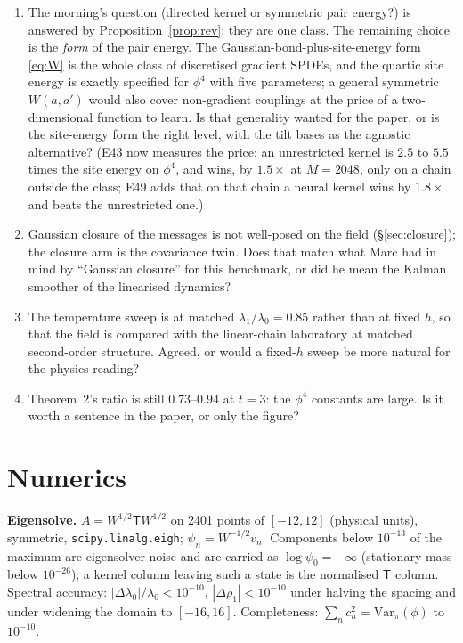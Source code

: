 \documentclass[10pt,a4paper]{article}
\newcommand{\code}[1]{\texttt{\small #1}}
\newcommand{\st}[1]{\textbf{#1}}
\theoremstyle{plain}
\theoremstyle{remark}
\begin{document}
\begin{enumerate}[leftmargin=1.4em,itemsep=0.15em]
\item The morning's question (directed kernel or symmetric pair energy?) is answered by
  Proposition~\ref{prop:rev}: they are one class. The remaining choice is the \emph{form} of the pair
  energy. The Gaussian-bond-plus-site-energy form \eqref{eq:W} is the whole class of discretised
  gradient SPDEs, and the quartic site energy is exactly specified for $\phi^4$ with five parameters;
  a general symmetric $W(a,a')$ would also cover non-gradient couplings at the price of a
  two-dimensional function to learn. Is that generality wanted for the paper, or is the site-energy
  form the right level, with the tilt bases as the agnostic alternative? (E43 now measures the price: an unrestricted kernel is $2.5$ to $5.5$ times the site energy on $\phi^4$, and wins, by $1.5\times$ at $M=2048$, only on a chain outside the class; E49 adds that on that chain a neural kernel wins by $1.8\times$ and beats the unrestricted one.)
\item Gaussian closure of the messages is not well-posed on the field (\S\ref{sec:closure}); the
  closure arm is the covariance twin. Does that match what Marc had in mind by ``Gaussian closure''
  for this benchmark, or did he mean the Kalman smoother of the linearised dynamics?
\item The temperature sweep is at matched $\lambda_1/\lambda_0=0.85$ rather than at fixed $h$, so that
  the field is compared with the linear-chain laboratory at matched second-order structure. Agreed, or
  would a fixed-$h$ sweep be more natural for the physics reading?
\item Theorem~2's ratio is still $0.73$--$0.94$ at $t=3$: the $\phi^4$ constants are large. Is it worth
  a sentence in the paper, or only the figure?
\end{enumerate}

\appendix
\section{Numerics}

\st{Eigensolve.} $A=W^{1/2}\mathsf TW^{1/2}$ on 2401 points of $[-12,12]$ (physical units), symmetric,
\code{scipy.linalg.eigh}; $\psi_n=W^{-1/2}v_n$. Components below $10^{-13}$ of the maximum are
eigensolver noise and are carried as $\log\psi_0=-\infty$ (stationary mass below $10^{-26}$); a kernel
column leaving such a state is the normalised $\mathsf T$ column. Spectral accuracy: $|\Delta\lambda_0|/\lambda_0<10^{-10}$,
$|\Delta\rho_1|<10^{-10}$ under halving the spacing and under widening the domain to $[-16,16]$.
Completeness: $\sum_nc_n^2=\mathrm{Var}_\pi(\phi)$ to $10^{-10}$.
\end{document}

